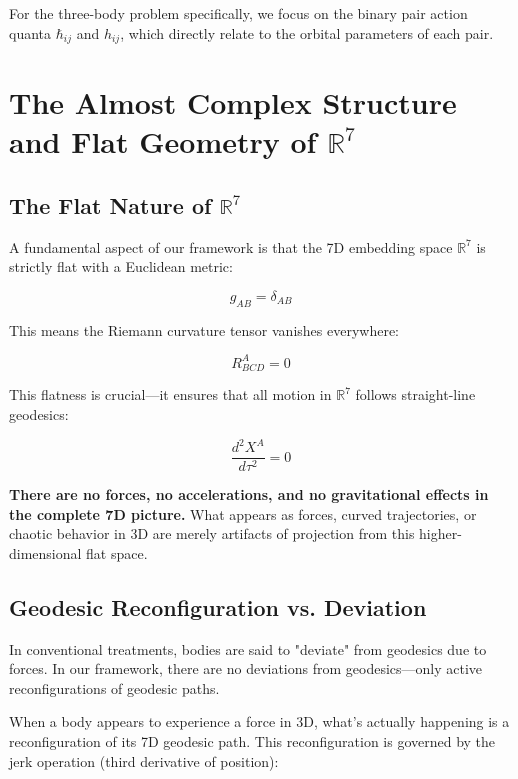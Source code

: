 \documentclass{article}
\begin{document}
For the three-body problem specifically, we focus on the binary pair action quanta $\hbar_{ij}$ and $h_{ij}$, which directly relate to the orbital parameters of each pair.

\section{The Almost Complex Structure and Flat Geometry of $\mathbb{R}^7$}

\subsection{The Flat Nature of $\mathbb{R}^7$}

A fundamental aspect of our framework is that the 7D embedding space $\mathbb{R}^7$ is strictly flat with a Euclidean metric:

\begin{equation}
g_{AB} = \delta_{AB}
\end{equation}

This means the Riemann curvature tensor vanishes everywhere:

\begin{equation}
R^A_{BCD} = 0
\end{equation}

This flatness is crucial—it ensures that all motion in $\mathbb{R}^7$ follows straight-line geodesics:

\begin{equation}
\frac{d^2 X^A}{d\tau^2} = 0
\end{equation}

\textbf{There are no forces, no accelerations, and no gravitational effects in the complete 7D picture.} What appears as forces, curved trajectories, or chaotic behavior in 3D are merely artifacts of projection from this higher-dimensional flat space.

\subsection{Geodesic Reconfiguration vs. Deviation}

In conventional treatments, bodies are said to "deviate" from geodesics due to forces. In our framework, there are no deviations from geodesics—only active reconfigurations of geodesic paths. 

When a body appears to experience a force in 3D, what's actually happening is a reconfiguration of its 7D geodesic path. This reconfiguration is governed by the jerk operation (third derivative of position):
\end{document}
